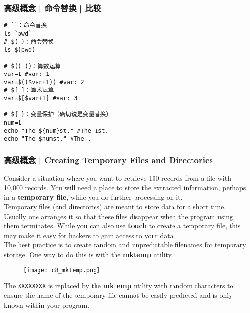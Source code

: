 \begin{frame}[fragile]
  \frametitle{高级概念 | 命令替换 | \alert{比较}}
\begin{lstlisting}
# ``：命令替换
ls `pwd`
# $( )：命令替换
ls $(pwd)

# $(( ))：算数运算
var=1 #var: 1
var=$(($var+1)) #var: 2
# $[ ]：算术运算
var=$[$var+1] #var: 3

# ${ }：变量保护（确切说是变量替换）
num=1
echo "The ${num}st." #The 1st.
echo "The $numst." #The .
\end{lstlisting}
\end{frame}

\begin{frame}[fragile]
  \frametitle{高级概念 | Creating Temporary Files and Directories}
  {\footnotesize
  Consider a situation where you want to retrieve 100 records from a file with 10,000 records. You will need a place to store the extracted information, perhaps in a \textbf{temporary file}, while you do further processing on it.\\
  \vspace{0.1cm}
  Temporary files (and directories) are meant to store data for a short time. Usually one arranges it so that these files disappear when the program using them terminates. While you can also use \textbf{touch} to create a temporary file, this may make it easy for hackers to gain access to your data.\\
  \vspace{0.1cm}
  The best practice is to create random and unpredictable filenames for temporary storage. One way to do this is with the \textbf{mktemp} utility.
  \vspace{-0.3cm}
  \begin{figure}
    \centering
    \texttt{[image: c8\_mktemp.png]}
  \end{figure}
  \vspace{-0.3cm}
  The \verb|XXXXXXXX| is replaced by the \textbf{mktemp} utility with random characters to ensure the name of the temporary file cannot be easily predicted and is only known within your program.
  }
\end{frame}

